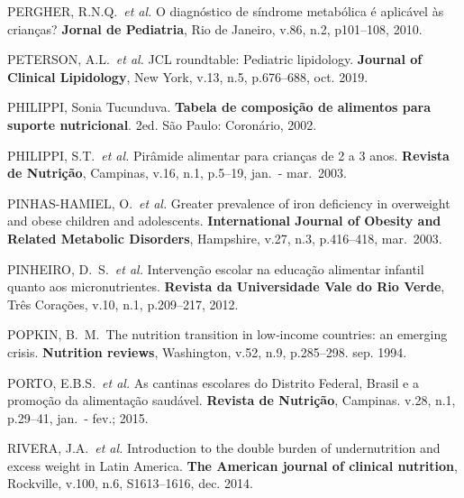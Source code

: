 \bigbreak

\noindent PERGHER, R.N.Q.\ \textit{et al.} O diagnóstico de síndrome metabólica é aplicável às crianças? \textbf{Jornal de Pediatria}, Rio de Janeiro, v.86, n.2, p101--108, 2010.

\bigbreak

\noindent PETERSON, A.L.\ \textit{et al.} JCL roundtable: Pediatric lipidology. \textbf{Journal of Clinical Lipidology}, New York, v.13, n.5, p.676--688, oct. 2019.
 
\bigbreak

\noindent PHILIPPI, Sonia Tucunduva. \textbf{Tabela de composição de alimentos para suporte nutricional}. 2ed. São Paulo: Coronário, 2002.

\bigbreak

\noindent PHILIPPI, S.T.\ \textit{et al.} Pirâmide alimentar para crianças de 2 a 3 anos. \textbf{Revista de Nutrição}, Campinas, v.16, n.1, p.5--19, jan.\ - mar.\ 2003.

\bigbreak

\noindent PINHAS-HAMIEL, O.\ \textit{et al.} Greater prevalence of iron deficiency in overweight and obese children and adolescents. \textbf{International Journal of Obesity and Related Metabolic Disorders}, Hampshire, v.27, n.3, p.416–418, mar.\ 2003.

\bigbreak

\noindent PINHEIRO, D.\ S.\ \textit{et al.} Intervenção escolar na educação alimentar infantil quanto aos micronutrientes. \textbf{Revista da Universidade Vale do Rio Verde}, Três Corações, v.10, n.1, p.209--217, 2012.

\bigbreak

\noindent POPKIN, B.\ M.\ The nutrition transition in low‐income countries: an emerging crisis. \textbf{Nutrition reviews}, Washington, v.52, n.9, p.285--298. sep. 1994. 

\bigbreak

\noindent PORTO, E.B.S.\ \textit{et al.} As cantinas escolares do Distrito Federal, Brasil e a promoção da alimentação saudável. \textbf{Revista de Nutrição}, Campinas. v.28, n.1, p.29--41, jan.\ - fev.; 2015.

\bigbreak

\noindent RIVERA, J.A.\ \textit{et al.} Introduction to the double burden of undernutrition and excess weight in Latin America. \textbf{The American journal of clinical nutrition}, Rockville, v.100, n.6, S1613--1616, dec. 2014.

\bigbreak


